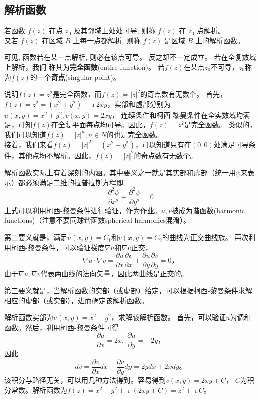 \subsection{解析函数}
\begin{Definition}
若函数 $f(z)$ 在点 $z_0$ 及其邻域上处处可导, 则称 $f(z)$ 在 $z_0$ 点解析。\\
 又若 $f(z)$ 在区域 $B$ 上每一点都解析, 则称 $f(z)$ 是区域 $B$ 上的解析函数。
\end{Definition} 
 可见, 函数若在某一点解析, 则必在该点可导。 反之却不一定成立。 若在全复数域上解析，我们
 称其为{\bf 完全函数}(entire function)。
 若$f(z)$在某点$z_0$不可导，$z_0$称为$f(z)$的一个{\bf 奇点}(singular point)。

 \begin{examplebox}{说明$f(z)=z^2$是完全函数，而$f(z)=|z|^2$的奇点数有无数个。}
    首先，$f(z) =z^2 = (x^2 + y ^2) + \imath 2 x y$，实部和虚部分别为$u(x,y) = x^2+ y^2, v(x,y)=2x y$，
连续条件和柯西-黎曼条件在全实数域均满足，可知$f(z)$在全复平面每点均可导。因此，$f(z)=z^2$是完全函数。
类似的，我们可以知道$f(z)=|z|^n, n\in N$的也是完全函数。\\
    接着，我们来看$f(z) = |z|^2 = (x^2 + y ^2)$，可以知道只有在$(0,0)$处满足可导条件，其他点均不解析。因此，$f(z)=|z|^2$的奇点数有无数个。
 \end{examplebox}

 解析函数实际上有着深刻的内涵。其中要义之一就是其实部和虚部（统一用$\psi$来表示）都必须满足二维的拉普拉斯方程即
 \begin{equation}
    \label{eq:Laplace_eq}
    \frac{\partial^2 \psi}{\partial x^2}+\frac{\partial^2 \psi}{\partial y^2}=0
 \end{equation}
上式可以利用柯西-黎曼条件进行验证，作为作业。$u,v$被成为谐函数(harmonic functions)（注意不要同球谐函数spherical harmonics混淆）。

第二要义就是，满足$u(x,y) = C_1$和$v(x,y)= C_2$的曲线为正交曲线族。
再次利用柯西-黎曼条件，可以验证梯度$\nabla u $和$\nabla v$正交，
\begin{equation}
    \nabla u \cdot \nabla v = \frac{\partial u}{\partial x} 
    \frac{\partial v}{\partial x}+\frac{\partial u}{\partial y} \frac{\partial v}{\partial y}=0 \textrm{，}
\end{equation}
由于$\nabla u, \nabla v$代表两曲线的法向矢量，因此两曲线是正交的。

第三要义就是，当解析函数的实部（或虚部）给定，可以根据柯西-黎曼条件求解相应的虚部（或实部），进而确定该解析函数。

\begin{examplebox}{解析函数实部为$u(x,y) = x^2 - y^2$，求解该解析函数。}
首先，可以验证$u$为调和函数。然后，利用柯西-黎曼条件可得
\begin{equation}
    \frac{\partial u}{\partial x } = 2x, \; \frac{\partial u}{\partial y } = -2y  \textrm{，}
\end{equation}
因此
\begin{equation}
    d v = \frac{\partial v}{\partial x } dx + \frac{\partial v}{\partial y } dy = 2y dx + 2x dy \textrm{。}
\end{equation}
该积分与路径无关，可以用几种方法得到。容易得到$v(x,y) = 2xy + C$， $C$为积分常数。解析函数为$f(z)=x^2 - y^2 + \imath (2x y + C) = z^2 + \imath C$。
\end{examplebox}
    